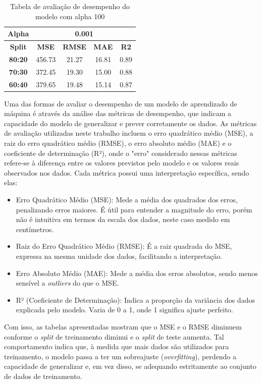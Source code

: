 \begin{table}[H]
\centering
\begin{tabular}{|c|c|c|c|c|}
\hline
\textbf{Alpha} & \multicolumn{4}{|c|}{\textbf{0.001}} \\
\hline
\textbf{Split} & \textbf{MSE} & \textbf{RMSE} & \textbf{MAE} & \textbf{R2} \\
\hline
\textbf{80:20} & 456.73 & 21.27 & 16.81 & 0.89 \\
\textbf{70:30} & 372.45 & 19.30 & 15.00 & 0.88 \\
\textbf{60:40} & 379.65 & 19.48 & 15.14 & 0.87 \\
\hline
\end{tabular}
\caption{Tabela de avaliação de desempenho do modelo com alpha 100}
\end{table}

Uma das formas de avaliar o desempenho de um modelo de aprendizado de máquina é através da análise das métricas de desempenho, que indicam a capacidade do modelo de generalizar e prever corretamente os dados. As métricas de avaliação utilizadas neste trabalho incluem o erro quadrático médio (MSE), a raiz do erro quadrático médio (RMSE), o erro absoluto médio (MAE) e o coeficiente de determinação (R²), onde o "erro" considerado nessas métricas refere-se à diferença entre os valores previstos pelo modelo e os valores reais observados nos dados. Cada métrica possui uma interpretação específica, sendo elas:

\begin{itemize}
	\item Erro Quadrático Médio (MSE): Mede a média dos quadrados dos erros, penalizando erros maiores. É útil para entender a magnitude do erro, porém não é intuitiva em termos da escala dos dados, neste caso medido em centímetros.
	\item Raiz do Erro Quadrático Médio (RMSE): É a raiz quadrada do MSE, expressa na mesma unidade dos dados, facilitando a interpretação.
	\item Erro Absoluto Médio (MAE): Mede a média dos erros absolutos, sendo menos sensível a \textit{outliers} do que o MSE.
	\item R² (Coeficiente de Determinação): Indica a proporção da variância dos dados explicada pelo modelo. Varia de 0 a 1, onde 1 significa ajuste perfeito.
\end{itemize}

Com isso, as tabelas apresentadas mostram que o MSE e o RMSE diminuem conforme o \textit{split} de treinamento diminui e o \textit{split} de teste aumenta. Tal comportamento indica que, à medida que mais dados são utilizados para treinamento, o modelo passa a ter um sobreajuste (\textit{overfitting}), perdendo a capacidade de generalizar e, em vez disso, se adequando estritamente ao conjunto de dados de treinamento.


